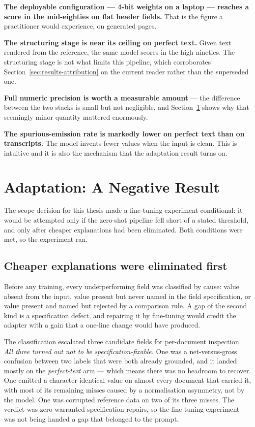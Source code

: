 

\textbf{The deployable configuration --- 4-bit weights on a laptop --- reaches a score in the
mid-eighties on flat header fields.} That is the figure a practitioner would experience, on
generated pages.

\textbf{The structuring stage is near its ceiling on perfect text.} Given text rendered from the
reference, the same model scores in the high nineties. The structuring stage is not what limits
this pipeline, which corroborates Section~\ref{sec:results-attribution} on the current reader rather
than the superseded one.

\textbf{Full numeric precision is worth a measurable amount} --- the difference between the two
stacks is small but not negligible, and Section~\ref{sec:results-adaptation} shows why that
seemingly minor quantity mattered enormously.

\textbf{The spurious-emission rate is markedly lower on perfect text than on transcripts.} The
model invents fewer values when the input is clean. This is intuitive and it is also the
mechanism that the adaptation result turns on.

\section{Adaptation: A Negative Result}
\label{sec:results-adaptation}

The scope decision for this thesis made a fine-tuning experiment conditional: it would be
attempted only if the zero-shot pipeline fell short of a stated threshold, and only after
cheaper explanations had been eliminated. Both conditions were met, so the experiment ran.

\subsection{Cheaper explanations were eliminated first}

Before any training, every underperforming field was classified by cause: value absent from the
input, value present but never named in the field specification, or value present and named but
rejected by a comparison rule. A gap of the second kind is a specification defect, and
repairing it by fine-tuning would credit the adapter with a gain that a one-line change would
have produced.

The classification escalated three candidate fields for per-document inspection.
\emph{All three turned out not to be specification-fixable.} One was a net-versus-gross confusion between two
labels that were both already grounded, and it landed mostly on the \emph{perfect-text} arm ---
which means there was no headroom to recover. One emitted a character-identical value on almost
every document that carried it, with most of its remaining misses caused by a
normalisation asymmetry, not by the model. One was corrupted reference data on two of its
three misses. The verdict was zero warranted specification repairs, so the fine-tuning
experiment was not being handed a gap that belonged to the prompt.

